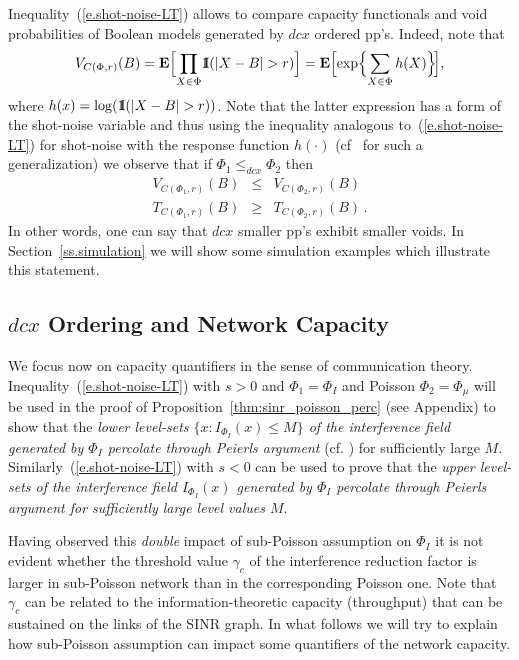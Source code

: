 \documentclass[conference]{IEEEtran}
\begin{document}
Inequality~(\ref{e.shot-noise-LT}) allows to compare capacity
functionals and  void probabilities of Boolean models 
generated by $dcx$ ordered pp's.
Indeed, note that 
$$
V_{C(\Phi,r)}(B)={{\mathbf E}}\Bigl[\prod_{X\in\Phi}\!{1\hspace{-0.30em}{\mbox{I}}}(|X-B|>r)\Bigr]
={{\mathbf E}}\Bigl[\exp\Bigl\{\sum_{X\in\Phi}h(X)\Bigr\}\!\Bigr],
$$
where $h(x)=\log({1\hspace{-0.30em}{\mbox{I}}}(|X-B|>r))$. Note that the latter expression has
a form of the shot-noise variable and thus
using the inequality analogous to~(\ref{e.shot-noise-LT}) for shot-noise 
with the response function $h(\cdot)$ (cf~\cite[Theorem 2.1]{snorder}
for such a generalization) we observe that
if $\Phi_1\leq_{dcx}\Phi_2$ then 
\begin{eqnarray*}
V_{C(\Phi_1,r)}(B)&\le& V_{C(\Phi_2,r)}(B)\\
T_{C(\Phi_1,r)}(B)&\ge& T_{C(\Phi_2,r)}(B)\,.
\end{eqnarray*}
In other words, one can say that $dcx$ smaller pp's exhibit smaller
voids. In Section~\ref{ss.simulation} we will show some 
simulation  examples which illustrate this statement.

\subsection{$dcx$ Ordering and Network Capacity}
\label{ss.NetCapacity}
We focus now on capacity quantifiers in the sense of communication theory.
Inequality~(\ref{e.shot-noise-LT}) with $s>0$ and 
$\Phi_1=\Phi_I$ and Poisson $\Phi_2=\Phi_\mu$
 will be used in the proof of Proposition~\ref{thm:sinr_poisson_perc} 
(see Appendix) to show that the {\em lower  level-sets
   $\{x:I_{\Phi_I}(x)\le M\}$ of the interference
field  generated by $\Phi_I$ percolate through Peierls argument}  
(cf. \cite[Proposition  14.1.4]{FnT1}) for sufficiently large $M$. 
Similarly~(\ref{e.shot-noise-LT})
with $s<0$ can be used to prove  that the {\em upper  level-sets of
  the interference 
field $I_{\Phi_I}(x)$ generated by $\Phi_I$ percolate through Peierls
argument for sufficiently large level values $M$}.

Having observed this {\em double} impact of sub-Poisson assumption 
on $\Phi_I$ it is not evident whether the threshold value $\gamma_c$
of the interference reduction factor is larger  in sub-Poisson
network than in the corresponding Poisson one.
Note that $\gamma_c$ can be related to the information-theoretic
capacity (throughput) that can be sustained on the links of the SINR graph.
In what follows we will try to explain  how sub-Poisson assumption
 can impact  some quantifiers of the network capacity.
\end{document}
